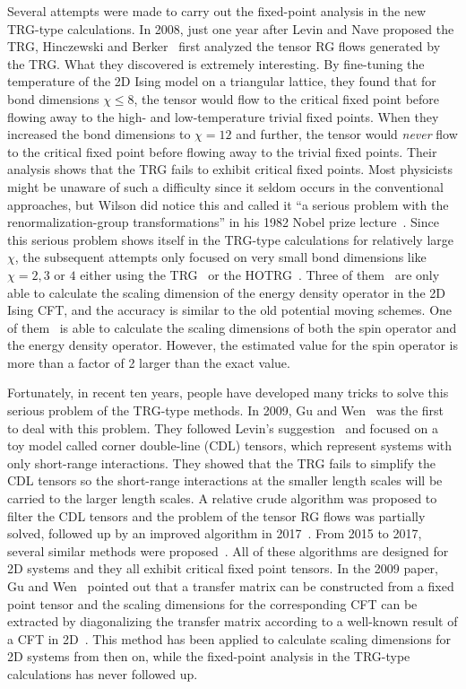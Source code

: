 \documentclass[aps,prb,reprint,superscriptaddress,floatfix]{revtex4-2}
\begin{document}
Several attempts were made to carry out the fixed-point analysis in the
new TRG-type calculations. In 2008, just one year after Levin and Nave
proposed the TRG, Hinczewski and Berker~\cite{Berker2008} first analyzed
the tensor RG flows generated by the TRG. What they discovered is
extremely interesting.  By fine-tuning the temperature of the 2D Ising
model on a triangular lattice, they found that for bond dimensions $\chi
\leq 8$, the tensor would flow to the critical fixed point before
flowing away to the high- and low-temperature trivial fixed points. When
they increased the bond dimensions to $\chi =  12$ and further, the
tensor would \textit{never} flow to the critical fixed point before
flowing away to the trivial fixed points. Their analysis shows that the
TRG fails to exhibit critical fixed points. Most physicists might be
unaware of such a difficulty since it seldom occurs in the conventional
approaches, but Wilson did notice this and called it ``a serious problem
with the renormalization-group transformations'' in his 1982 Nobel prize
lecture~\cite{wilsonNobel}.  Since this serious problem shows itself in
the TRG-type calculations for relatively large $\chi$, the subsequent
attempts only focused on very small bond dimensions like $\chi = 2, 3$
or $4$ either using the TRG~\cite{kadanoff2014,aoki2009} or the
HOTRG~\cite{meurice2013}. Three of
them~\cite{Berker2008,aoki2009,meurice2013} are only able to calculate
the scaling dimension of the energy density operator in the 2D Ising
CFT, and the accuracy is similar to the old potential moving schemes.
One of them~\cite{kadanoff2014} is able to calculate the scaling
dimensions of both the spin operator and the energy density operator.
However, the estimated value for the spin operator is more than a factor
of 2 larger than the exact value. 
%

Fortunately, in recent ten years, people have developed many tricks to
solve this serious problem of the TRG-type methods. In 2009, Gu and
Wen~\cite{GuWen2009} was the first to deal with this problem. They
followed Levin's suggestion~\cite{trg,LevinTalk} and focused on a toy
model called corner double-line (CDL) tensors, which represent systems
with only short-range interactions. They showed that the TRG fails to
simplify the CDL tensors so the short-range interactions at the smaller
length scales will be carried to the larger length scales. A relative
crude algorithm was proposed to filter the CDL tensors and the problem
of the tensor RG flows was partially solved, followed up by an improved
algorithm in 2017~\cite{looptnr}. From 2015 to 2017, several similar
methods were proposed~\cite{tnr,tnralgo,tnrplus}. All of these
algorithms are designed for 2D systems and they all exhibit critical
fixed point tensors. In the 2009 paper, Gu and Wen~\cite{GuWen2009}
pointed out that a transfer matrix can be constructed from a fixed point
tensor and the scaling dimensions for the corresponding CFT can be
extracted by diagonalizing the transfer matrix according to a well-known
result of a CFT in 2D~\cite{cardy1986}. This method has been applied to
calculate scaling dimensions for 2D systems from then on, while the
fixed-point analysis in the TRG-type calculations has never followed up.
%
\end{document}
